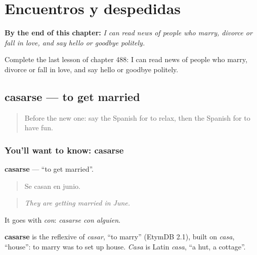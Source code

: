 
\chapter{Encuentros y despedidas}
\label{ch:es-encuentros-y-despedidas}

\begin{chapteropening}
\textbf{By the end of this chapter:} \emph{I can read news of people who marry, divorce or fall in love, and say hello or goodbye politely.}

Complete the last lesson of chapter 488: I can read news of people who marry, divorce or fall in love, and say hello or goodbye politely.
\end{chapteropening}

\section[casarse]{casarse — to get married}

\label{lesson:ES-C488-casarse}



\begin{quote}
Before the new one: say the Spanish for to relax, then the Spanish for to have fun.
\end{quote}

\subsection*{You'll want to know: casarse}
\textbf{casarse} — \textquotedblleft{}to get married\textquotedblright{}.

\begin{quote}
Se casan en junio.
\end{quote}

\begin{quote}
\emph{They are getting married in June.}
\end{quote}

It goes with \emph{con}: \emph{casarse con alguien}.

\begin{cousinweb}
\textbf{casarse} is the reflexive of \emph{casar}, \textquotedblleft{}to marry\textquotedblright{} (EtymDB 2.1), built on \emph{casa}, \textquotedblleft{}house\textquotedblright{}: to marry was to set up house. \emph{Casa} is Latin \emph{casa}, \textquotedblleft{}a hut, a cottage\textquotedblright{}.
\end{cousinweb}


